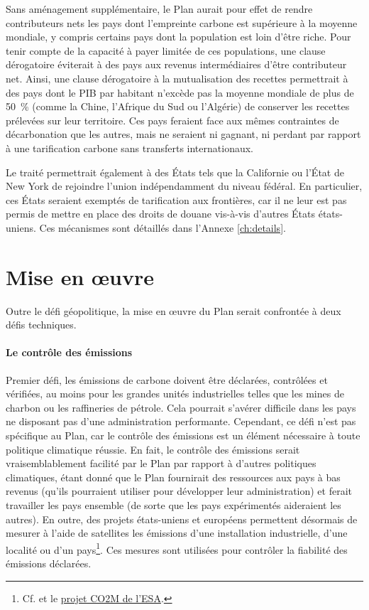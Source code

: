 \documentclass[a5paper,french,openany]{memoir}
\begin{document}
Sans aménagement supplémentaire, le Plan aurait pour effet de rendre contributeurs nets les pays dont l'empreinte carbone est supérieure à la moyenne mondiale, y compris certains pays dont la population est loin d'être riche. Pour tenir compte de la capacité à payer limitée de ces populations, une clause dérogatoire éviterait à des pays aux revenus intermédiaires d'être contributeur net. Ainsi, une clause dérogatoire à la mutualisation des recettes permettrait à des pays dont le PIB par habitant n'excède pas la moyenne mondiale de plus de 50~\% (comme la Chine, l'Afrique du Sud ou l'Algérie) de conserver les recettes prélevées sur leur territoire. Ces pays feraient face aux mêmes contraintes de décarbonation que les autres, mais ne seraient ni gagnant, ni perdant par rapport à une tarification carbone sans transferts internationaux. 

Le traité permettrait également à des États tels que la Californie ou l'État de New York de rejoindre l'union indépendamment du niveau fédéral. En particulier, ces États seraient exemptés de tarification aux frontières, car il ne leur est pas permis de mettre en place des droits de douane vis-à-vis d'autres États états-uniens. 
Ces mécanismes sont détaillés dans l'Annexe \ref{ch:details}. 


\section{Mise en œuvre}\label{sec:implementation}
Outre le défi géopolitique, la mise en œuvre du Plan serait confrontée à deux défis techniques. 

\paragraph{Le contrôle des émissions}
Premier défi, les émissions de carbone doivent être déclarées, contrôlées et vérifiées, au moins %
pour les grandes unités industrielles telles que les mines de charbon ou les raffineries de pétrole. Cela pourrait s'avérer difficile dans les pays ne disposant pas d'une administration performante. Cependant, ce défi n'est pas spécifique au Plan, car le contrôle des émissions est un élément nécessaire à toute politique climatique réussie. En fait, le contrôle des émissions serait vraisemblablement facilité par le Plan par rapport à d'autres politiques climatiques, étant donné que le Plan fournirait des ressources aux pays à bas revenus (qu'ils pourraient utiliser pour développer leur administration) et ferait travailler les pays ensemble (de sorte que les pays expérimentés aideraient les autres). En outre, des projets états-uniens et européens permettent désormais de mesurer à l'aide de satellites les émissions d'une installation industrielle, d'une localité ou d'un pays\footnote{Cf. \cite{%
pan_potential_2021,shen_national_2023} et le \href{https://www.esa.int/Applications/Observing_the_Earth/Copernicus/Carbon_dioxide_monitoring_satellite_given_the_shakes}{projet CO2M de l'ESA}.}. Ces mesures sont utilisées pour contrôler la fiabilité des émissions déclarées.
\end{document}
